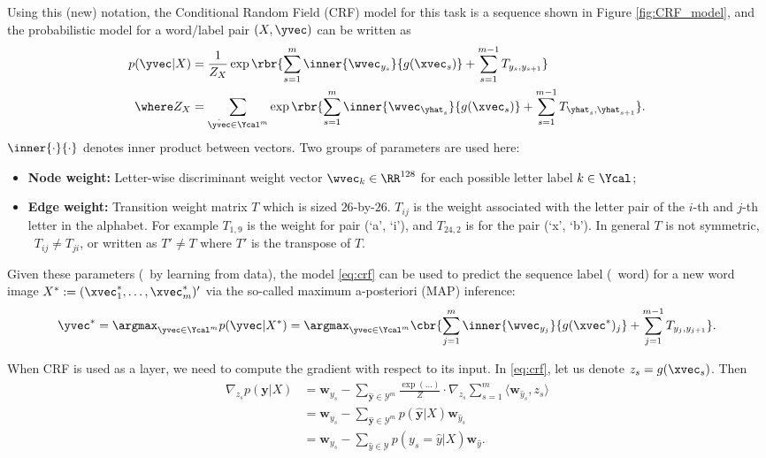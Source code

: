 \documentclass[11pt]{report}
\begin{document}
Using this (new) notation, the Conditional Random Field (CRF) model for this
task is a sequence shown in Figure \ref{fig:CRF_model}, and the probabilistic
model for a word/label pair $(X, \yvec)$ can be written as
%
\begin{align}
  \label{eq:crf}
  p(\yvec | X ) &= \frac{1}{Z_X} \exp \rbr{\sum_{s=1}^m \inner{\wvec_{y_s}}{g(\xvec_s)} + \sum_{s=1}^{m-1} T_{y_s, y_{s+1}}} \\
  \where Z_X &= \sum_{\hat{\yvec} \in \Ycal^m} \exp \rbr{\sum_{s=1}^m \inner{\wvec_{\yhat_s}}{g(\xvec_s)} + \sum_{s=1}^{m-1} T_{\yhat_s, \yhat_{s+1}}}.
\end{align}
$\inner{\cdot}{\cdot}$ denotes inner product between vectors. Two groups of
parameters are used here:

\vspace{-1em}
\begin{itemize}

\item {\bf Node weight:} Letter-wise discriminant weight vector $\wvec_k \in
  \RR^{128}$ for each possible letter label $k \in \Ycal$;

\item {\bf Edge weight:} Transition weight matrix $T$ which is sized
  $26$-by-$26$. $T_{ij}$ is the weight associated with the letter pair of the
  $i$-th and $j$-th letter in the alphabet. For example $T_{1,9}$ is the weight
  for pair (`a', `i'), and $T_{24,2}$ is for the pair (`x', `b'). In general $T$
  is not symmetric, \ie\ $T_{ij} \neq T_{ji}$, or written as $T' \neq T$ where
  $T'$ is the transpose of $T$.
\end{itemize}

Given these parameters (\eg\ by learning from data), the model \eqref{eq:crf}
can be used to predict the sequence label (\ie\ word) for a new word image $X^*
:= (\xvec^*_1, \ldots, \xvec^*_m)'$ via the so-called maximum a-posteriori (MAP)
inference:
%
\begin{align}
	\label{eq:crf_decode}
	\yvec^* = \argmax_{\yvec \in \Ycal^m} p(\yvec | X^*)
	= \argmax_{\yvec \in \Ycal^m} \cbr{ \sum_{j=1}^m \inner{\wvec_{y_j}}{g(\xvec^*)_j} + \sum_{j=1}^{m-1} T_{y_j, y_{j+1}}}.
\end{align}

When CRF is used as a layer, we need to compute the gradient with respect to its input.
In \eqref{eq:crf}, let us denote $z_s = g(\xvec_s)$. 
Then
\begin{align}
	\nabla_{z_s} p(\mathbf{y}|X) 
	&= \mathbf{w}_{y_s} - \sum_{\hat{\mathbf{y}} \in \mathcal{Y}^m} \frac{\exp(...)}{Z} \cdot \nabla_{z_s} \sum_{s = 1}^m \langle \mathbf{w}_{\hat{y}_s}, z_s \rangle \\
	&= \mathbf{w}_{y_s} -\sum_{\hat{\mathbf{y}} \in \mathcal{Y}^m} p(\hat{\mathbf{y}}|X) \mathbf{w}_{\hat{y}_s} \\
	&= \mathbf{w}_{y_s} - \sum_{\hat{y} \in \mathcal{Y}} p(y_s = \hat{y} |X ) \mathbf{w}_{\hat{y}}.
\end{align}
\end{document}
